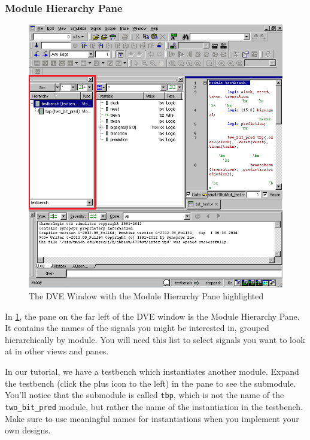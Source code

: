 \documentclass[dvipsnames]{article}
\begin{document}
\subsubsection{Module Hierarchy Pane}
    \begin{figure}[H]
        \begin{center}
        	\includegraphics[scale=0.85]{mod-hier-pane}
        	\caption{The DVE Window with the Module Hierarchy Pane highlighted}
        	\label{fig:mod-hier-pane}
    	\end{center}
    \end{figure}


In \cref{fig:mod-hier-pane}, the pane on the far left of the DVE window is the 
Module Hierarchy Pane. It contains the names of the signals you might be 
interested in, grouped hierarchically by module. You will need this list to 
select signals you want to look at in other views and panes. 

In our tutorial, we have a testbench which instantiates another module. Expand
the testbench (click the plus icon to the left) in the pane to see the submodule. You'll notice that the submodule is called \texttt{tbp}, which is not the name of the \texttt{two\_bit\_pred}
module, but rather the name of the instantiation in the testbench. Make sure to use 
meaningful names for instantiations when you implement your own designs. 
\end{document}
